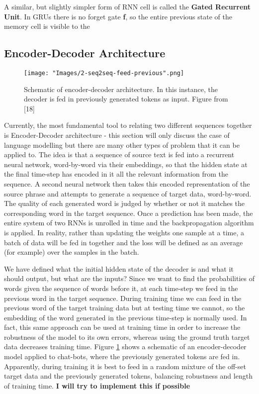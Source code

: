 \documentclass[]{article}
\begin{document}
A similar, but slightly simpler form of RNN cell is called the \textbf{Gated Recurrent Unit}. In GRUs there is no forget gate \textbf{f}, so the entire previous state of the memory cell  is visible to the 

\subsection{Encoder-Decoder Architecture}
\begin{figure}	\centering
	\texttt{[image: "Images/2-seq2seq-feed-previous".png]}
	\caption{Schematic of encoder-decoder architecture. In this instance, the decoder is fed in previously generated tokens as input. Figure from [18]}
	\label{fig:encoder-decoder}
\end{figure}
Currently, the most fundamental tool to relating two different sequences together is Encoder-Decoder architecture - this section will only discuss the case of language modelling but there are many other types of problem that it can be applied to. The idea is that a sequence of source text is fed into a recurrent neural network, word-by-word via their embeddings, so that the hidden state at the final time-step has encoded in it all the relevant information from the sequence. A second neural network then takes this encoded representation of the source phrase and attempts to generate a sequence of target data, word-by-word. The quality of each generated word is judged by whether or not it matches the corresponding word in the target sequence. Once a prediction has been made, the entire system of two RNNs is unrolled in time and the backpropagation algorithm is applied. In reality, rather than updating the weights one sample at a time, a batch of data will be fed in together and the loss will be defined as an average (for example) over the samples in the batch. 

We have defined what the initial hidden state of the decoder is and what it should output, but what are the inputs? Since we want to find the probabilities of words given the sequence of words before it, at each time-step we feed in the previous word in the target sequence. During training time we can feed in the previous word of the target training data but at testing time we cannot, so the embedding of the word generated in the previous time-step is normally used. In fact, this same approach can be used at training time in order to increase the robustness of the model to its own errors, whereas using the ground truth target data decreases training time. Figure \ref{fig:encoder-decoder} shows a schematic of an encoder-decoder model applied to chat-bots, where the previously generated tokens are fed in. Apparently, during training it is best to feed in a random mixture of the off-set target data and the previously generated tokens, balancing robustness and length of training time. \textbf{I will try to implement this if possible}
\end{document}
